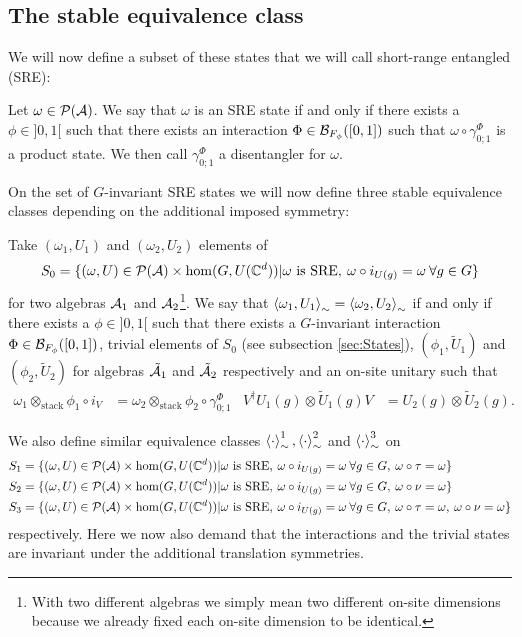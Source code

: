 \documentclass[11pt,a4paper,twoside]{article}
\numberwithin{equation}{section}
\begin{document}
	\subsection{The stable equivalence class}\label{sec:StableEquivalenceClasses}
	We will now define a subset of these states that we will call short-range entangled (SRE):
	\begin{definition}\label{def:sre}
		Let $\omega\in\PP(\AA)$. We say that $\omega$ is an SRE state if and only if there exists a $\phi\in]0,1[$ such that there exists an interaction $\Phi\in\BB_{F_\phi}([0,1])$ such that $\omega\circ\gamma^\Phi_{0;1}$ is a product state. We then call $\gamma^\Phi_{0;1}$ a disentangler for $\omega$.
	\end{definition}
	On the set of $G$-invariant SRE states we will now define three stable equivalence classes depending on the additional imposed symmetry:
	\begin{definition}
		Take $(\omega_1,U_1)$ and $(\omega_2,U_2)$ elements of
		\begin{equation}
			S_0=\{(\omega,U)\in\PP(\AA)\times\hom(G,U(\CC^d))|\omega\text{ is SRE},\:\omega\circ i_{U(g)}=\omega\:\forall g\in G\}
		\end{equation}
		for two algebras $\AA_1$ and $\AA_2$\footnote{With two different algebras we simply mean two different on-site dimensions because we already fixed each on-site dimension to be identical.}. We say that $\expval{\omega_1,U_1}_\sim=\expval{\omega_2,U_2}_\sim$ if and only if there exists a $\phi\in]0,1[$ such that there exists a $G$-invariant interaction $\Phi\in\BB_{F_\phi}([0,1])$, trivial elements of $S_0$ (see subsection \ref{sec:States}), $(\phi_1,\tilde U_1)$ and $(\phi_2,\tilde U_2)$ for algebras $\tilde\AA_1$ and $\tilde\AA_2$ respectively and an on-site unitary such that
		\begin{align}
			\omega_1\otimes_{\text{stack}}\phi_1\circ i_V&=\omega_2\otimes_{\text{stack}}\phi_2\circ\gamma^\Phi_{0;1}&V^\dagger U_{1}(g)\otimes \tilde{U}_{1}(g)V&=U_{2}(g)\otimes \tilde{U}_{2}(g).
		\end{align}
	\end{definition}
	We also define similar equivalence classes $\expval{\cdot}_\sim^1,\expval{\cdot}_\sim^2$ and $\expval{\cdot}_\sim^3$ on
	\begin{align}
		S_1&=\{(\omega,U)\in\PP(\AA)\times\hom(G,U(\CC^d))|\omega\text{ is SRE},\:\omega\circ i_{U(g)}=\omega\:\forall g\in G,\:\omega\circ\tau=\omega\}\\
		S_2&=\{(\omega,U)\in\PP(\AA)\times\hom(G,U(\CC^d))|\omega\text{ is SRE},\:\omega\circ i_{U(g)}=\omega\:\forall g\in G,\:\omega\circ\nu=\omega\}\\
		S_3&=\{(\omega,U)\in\PP(\AA)\times\hom(G,U(\CC^d))|\omega\text{ is SRE},\:\omega\circ i_{U(g)}=\omega\:\forall g\in G,\:\omega\circ\tau=\omega,\:\omega\circ\nu=\omega\}
	\end{align}
	respectively. Here we now also demand that the interactions and the trivial states are invariant under the additional translation symmetries.
\end{document}
